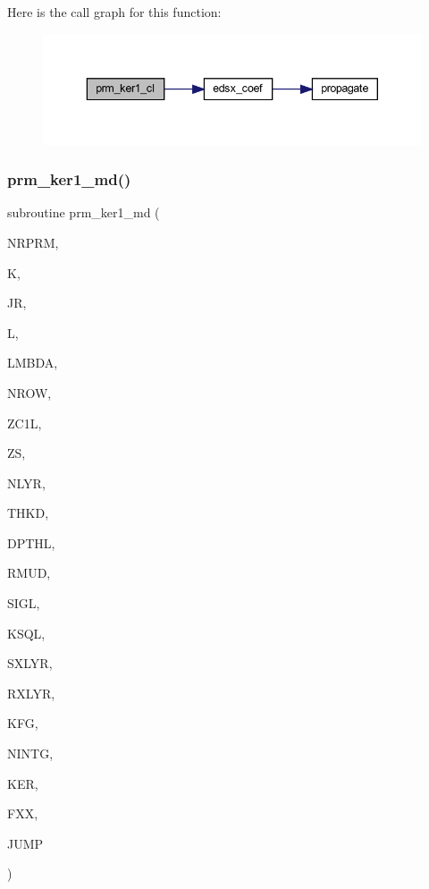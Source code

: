 Here is the call graph for this function\+:\nopagebreak
\begin{figure}[H]
\begin{center}
\leavevmode
\includegraphics[width=343pt]{Leroi__c_8f90_a2ff2214d55840301662aae090b26e04d_cgraph}
\end{center}
\end{figure}
\mbox{\label{Leroi__c_8f90_a3a9566c86f1c0b93bae5a6117621feae}} 
\subsubsection{\texorpdfstring{prm\+\_\+ker1\+\_\+md()}{prm\_ker1\_md()}}
{\footnotesize\ttfamily subroutine prm\+\_\+ker1\+\_\+md (\begin{DoxyParamCaption}\item[{integer}]{N\+R\+P\+RM,  }\item[{integer}]{K,  }\item[{integer}]{JR,  }\item[{integer}]{L,  }\item[{real(kind=ql)}]{L\+M\+B\+DA,  }\item[{integer}]{N\+R\+OW,  }\item[{real, dimension(nrow)}]{Z\+C1L,  }\item[{real(kind=ql)}]{ZS,  }\item[{integer}]{N\+L\+YR,  }\item[{real(kind=ql), dimension (nlyr)}]{T\+H\+KD,  }\item[{real(kind=ql), dimension (nlyr)}]{D\+P\+T\+HL,  }\item[{real(kind=ql), dimension(0\+:nlyr)}]{R\+M\+UD,  }\item[{complex(kind=ql), dimension (nlyr)}]{S\+I\+GL,  }\item[{complex(kind=ql), dimension (nlyr)}]{K\+S\+QL,  }\item[{integer}]{S\+X\+L\+YR,  }\item[{integer}]{R\+X\+L\+YR,  }\item[{integer}]{K\+FG,  }\item[{integer}]{N\+I\+N\+TG,  }\item[{complex (kind=ql), dimension(jnlo-\/nrprm\+:jnhi,5,nrow)}]{K\+ER,  }\item[{complex (kind=ql), dimension(nrprm,5,nrow)}]{F\+XX,  }\item[{logical}]{J\+U\+MP }\end{DoxyParamCaption})}

